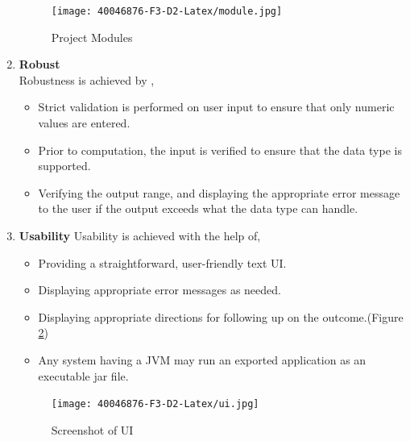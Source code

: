 \documentclass[
	12pt
]{article}
\begin{document}
\begin{enumerate}
\begin{itemize}
\end{itemize}
 \begin{figure}[htp]
    \centering
    \texttt{[image: 40046876-F3-D2-Latex/module.jpg]}
    \caption{ Project Modules}
    \label{Project Modules}
\end{figure}
\item \textbf{Robust}\\
Robustness is achieved by ,
\begin{itemize}
    \item Strict validation is performed on user input to ensure that only numeric values are entered.
    \item Prior to computation, the input is verified to ensure that the data type is supported.
    \item Verifying the output range, and displaying the appropriate error message to the user if the output exceeds what the data type can handle.\\
\end{itemize}
\item \textbf{Usability}
\newline Usability is achieved with the help of,
\begin{itemize}
    \item Providing a straightforward, user-friendly text UI.
    \item Displaying appropriate error messages as needed.
    \item Displaying appropriate directions for following up on the outcome.(Figure \ref{Screenshot of  UI})
    \item Any system having a JVM may run an exported application as an executable jar file.
\end{itemize}
\begin{figure}[htp]
    \centering
    \texttt{[image: 40046876-F3-D2-Latex/ui.jpg]}
        \caption{Screenshot of  UI}
    \label{Screenshot of  UI}
\end{figure}
\end{enumerate}
\newpage
\end{document}
